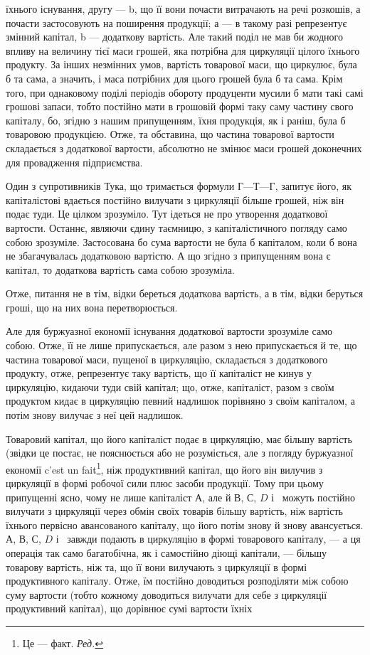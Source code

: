 \parcont{}  %
їхнього існування, другу — b, що її вони почасти витрачають на речі
розкошів, а почасти застосовують на поширення продукції; а — в такому
разі репрезентує змінний капітал, b — додаткову вартість. Але такий поділ
не мав би жодного впливу на величину тієї маси грошей, яка потрібна
для циркуляції цілого їхнього продукту. За інших незмінних умов, вартість
товарової маси, що циркулює, була б та сама, а значить, і маса
потрібних для цього грошей була б та сама. Крім того, при однаковому
поділі періодів обороту продуценти мусили б мати такі самі грошові запаси,
тобто постійно мати в грошовій формі таку саму частину свого
капіталу, бо, згідно з нашим припущенням, їхня продукція, як і раніш,
була б товаровою продукцією. Отже, та обставина, що частина товарової
вартости складається з додаткової вартости, абсолютно не змінює маси
грошей доконечних для провадження підприємства.

Один з супротивників Тука, що тримається формули $Г — Т — Г$, запитує
його, як капіталістові вдається постійно вилучати з циркуляції більше
грошей, ніж він подає туди. Це цілком зрозуміло. Тут ідеться не про
утворення додаткової вартости. Останнє, являючи єдину таємницю, з
капіталістичного погляду само собою зрозуміле. Застосована бо сума вартости
не була б капіталом, коли б вона не збагачувалась додатковою
вартістю. А що згідно з припущенням вона є капітал, то додаткова вартість
сама собою зрозуміла.

Отже, питання не в тім, відки береться додаткова вартість, а в тім,
відки беруться гроші, що на них вона перетворюється.

Але для буржуазної економії існування додаткової вартости зрозуміле
само собою. Отже, її не лише припускається, але разом з нею припускається
й те, що частина товарової маси, пущеної в циркуляцію, складається
з додаткового продукту, отже, репрезентує таку вартість, що її капіталіст
не кинув у циркуляцію, кидаючи туди свій капітал; що, отже, капіталіст,
разом з своїм продуктом кидає в циркуляцію певний надлишок
порівняно з своїм капіталом, а потім знову вилучає з неї цей надлишок.

Товаровий капітал, що його капіталіст подає в циркуляцію, має більшу
вартість (звідки це постає, не пояснюється або не розуміється, але з
погляду буржуазної економії c’est un fait\footnote*{
Це — факт. \emph{Ред.}
}, ніж продуктивний капітал,
що його він вилучив з циркуляції в формі робочої сили плюс засоби
продукції. Тому при цьому припущенні ясно, чому не лише капіталіст
$А$, але й $В$, $С$, $D$ і~ можуть постійно вилучати з циркуляції через
обмін своїх товарів більшу вартість, ніж вартість їхнього первісно авансованого
капіталу, що його потім знову й знову авансується. $А$, $В$, $С$,
$D$ і~ завжди подають в циркуляцію в формі товарового капіталу, —
а ця операція так само багатобічна, як і самостійно діющі капітали, —
більшу товарову вартість, ніж та, що її вони вилучають з циркуляції в
формі продуктивного капіталу. Отже, їм постійно доводиться розподіляти
між собою суму вартости (тобто кожному доводиться вилучати для себе
з циркуляції продуктивний капітал), що дорівнює сумі вартости їхніх
\parbreak{}  %
